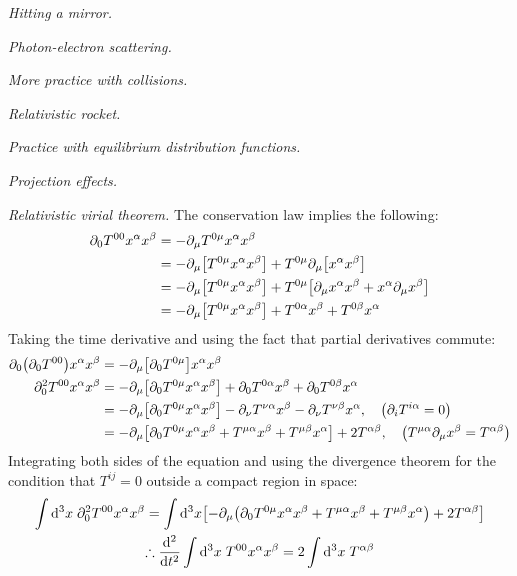 \documentclass{report}
\begin{document}
\begin{subquests}
	\item \emph{Hitting a mirror.}

	\item \emph{Photon-electron scattering.}

	\item \emph{More practice with collisions.}

	\item \emph{Relativistic rocket.}

	\item \emph{Practice with equilibrium distribution functions.}

	\item \emph{Projection effects.}

	\item \emph{Relativistic virial theorem.}
	The conservation law implies the following:
	\begin{align*}
		\partial_0 T^{00}x^{\alpha}x^{\beta} & = -\partial_{\mu}T^{0\mu}x^{\alpha}x^{\beta} \\
		& = -\partial_{\mu}\bqty{T^{0\mu}x^{\alpha}x^{\beta}} + T^{0\mu}\partial_{\mu}\bqty{x^{\alpha}x^{\beta}} \\
		& = -\partial_{\mu}\bqty{T^{0\mu}x^{\alpha}x^{\beta}} + T^{0\mu}\bqty{\partial_{\mu}x^{\alpha}x^{\beta} + x^{\alpha}\partial_{\mu}x^{\beta}} \\
		& =  -\partial_{\mu}\bqty{T^{0\mu}x^{\alpha}x^{\beta}} + T^{0\alpha}x^{\beta} + T^{0\beta}x^{\alpha}
	\end{align*}
	Taking the time derivative and using the fact that partial derivatives commute:
	\begin{align*}
		\partial_0\pqty{\partial_0 T^{00}}x^{\alpha}x^{\beta} & = -\partial_{\mu}\bqty{\partial_0 T^{0\mu}}x^{\alpha}x^{\beta} \\
		\partial^2_0 T^{00}x^{\alpha}x^{\beta} & = -\partial_{\mu}\bqty{\partial_0 T^{0\mu}x^{\alpha}x^{\beta}} + \partial_0 T^{0\alpha}x^{\beta} + \partial_0 T^{0\beta}x^{\alpha} \\
		& = -\partial_{\mu}\bqty{\partial_0 T^{0\mu}x^{\alpha}x^{\beta}} - \partial_{\nu}T^{\nu\alpha}x^{\beta} - \partial_{\nu}T^{\nu\beta}x^{\alpha}, \quad \pqty{\partial_i T^{i\alpha} = 0} \\
		& = -\partial_{\mu}\bqty{\partial_0 T^{0\mu}x^{\alpha}x^{\beta} + T^{\mu\alpha}x^{\beta} + T^{\mu\beta}x^{\alpha}} + 2 T^{\alpha\beta}, \quad \pqty{T^{\mu\alpha}\partial_{\mu}x^{\beta} = T^{\alpha\beta}}
	\end{align*}
	Integrating both sides of the equation and using the divergence theorem for the condition that $T^{ij} = 0$ outside a compact region in space:
	\begin{gather*}
		\int \dd^3{x}\;\partial^2_0 T^{00} x^{\alpha}x^{\beta} = \int \dd^3{x} \bqty{-\partial_{\mu}\pqty{\partial_0 T^{0\mu}x^{\alpha}x^{\beta} + T^{\mu\alpha}x^{\beta} + T^{\mu\beta}x^{\alpha}} + 2 T^{\alpha\beta}} \\
		\therefore \dv[2]{t}\int \dd^3{x}\;T^{00} x^{\alpha} x^{\beta} = 2 \int \dd^3{x}\; T^{\alpha\beta}
	\end{gather*}


\end{subquests}
\end{document}
